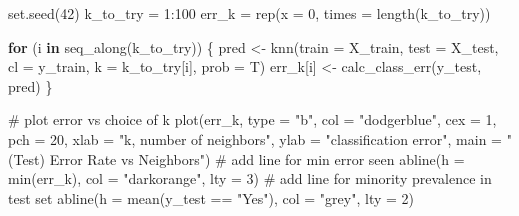 \documentclass[
  letterpaper,
  DIV=11,
  numbers=noendperiod]{scrartcl}
\newenvironment{Shaded}{\begin{snugshade}}{\end{snugshade}}
\newcommand{\AttributeTok}[1]{\textcolor[rgb]{0.40,0.45,0.13}{#1}}
\newcommand{\CommentTok}[1]{\textcolor[rgb]{0.37,0.37,0.37}{#1}}
\newcommand{\ControlFlowTok}[1]{\textcolor[rgb]{0.00,0.23,0.31}{\textbf{#1}}}
\newcommand{\DecValTok}[1]{\textcolor[rgb]{0.68,0.00,0.00}{#1}}
\newcommand{\FunctionTok}[1]{\textcolor[rgb]{0.28,0.35,0.67}{#1}}
\newcommand{\NormalTok}[1]{\textcolor[rgb]{0.00,0.23,0.31}{#1}}
\newcommand{\OtherTok}[1]{\textcolor[rgb]{0.00,0.23,0.31}{#1}}
\newcommand{\SpecialCharTok}[1]{\textcolor[rgb]{0.37,0.37,0.37}{#1}}
\newcommand{\StringTok}[1]{\textcolor[rgb]{0.13,0.47,0.30}{#1}}
\begin{document}
\begin{Shaded}
\begin{Highlighting}[]
\FunctionTok{set.seed}\NormalTok{(}\DecValTok{42}\NormalTok{)}
\NormalTok{k\_to\_try }\OtherTok{=} \DecValTok{1}\SpecialCharTok{:}\DecValTok{100}
\NormalTok{err\_k }\OtherTok{=} \FunctionTok{rep}\NormalTok{(}\AttributeTok{x =} \DecValTok{0}\NormalTok{, }\AttributeTok{times =} \FunctionTok{length}\NormalTok{(k\_to\_try))}

\ControlFlowTok{for}\NormalTok{ (i }\ControlFlowTok{in} \FunctionTok{seq\_along}\NormalTok{(k\_to\_try)) \{}
\NormalTok{  pred }\OtherTok{\textless{}{-}} \FunctionTok{knn}\NormalTok{(}\AttributeTok{train =}\NormalTok{ X\_train, }
             \AttributeTok{test  =}\NormalTok{ X\_test, }
             \AttributeTok{cl    =}\NormalTok{ y\_train, }
             \AttributeTok{k     =}\NormalTok{ k\_to\_try[i], }
             \AttributeTok{prob =}\NormalTok{ T)}
\NormalTok{  err\_k[i] }\OtherTok{\textless{}{-}} \FunctionTok{calc\_class\_err}\NormalTok{(y\_test, pred)}
\NormalTok{\}}
\end{Highlighting}
\end{Shaded}

\begin{Shaded}
\begin{Highlighting}[]
\CommentTok{\# plot error vs choice of k}
\FunctionTok{plot}\NormalTok{(err\_k, }\AttributeTok{type =} \StringTok{"b"}\NormalTok{, }\AttributeTok{col =} \StringTok{"dodgerblue"}\NormalTok{, }\AttributeTok{cex =} \DecValTok{1}\NormalTok{, }\AttributeTok{pch =} \DecValTok{20}\NormalTok{, }
     \AttributeTok{xlab =} \StringTok{"k, number of neighbors"}\NormalTok{, }\AttributeTok{ylab =} \StringTok{"classification error"}\NormalTok{,}
     \AttributeTok{main =} \StringTok{"(Test) Error Rate vs Neighbors"}\NormalTok{)}
\CommentTok{\# add line for min error seen}
\FunctionTok{abline}\NormalTok{(}\AttributeTok{h =} \FunctionTok{min}\NormalTok{(err\_k), }\AttributeTok{col =} \StringTok{"darkorange"}\NormalTok{, }\AttributeTok{lty =} \DecValTok{3}\NormalTok{)}
\CommentTok{\# add line for minority prevalence in test set}
\FunctionTok{abline}\NormalTok{(}\AttributeTok{h =} \FunctionTok{mean}\NormalTok{(y\_test }\SpecialCharTok{==} \StringTok{"Yes"}\NormalTok{), }\AttributeTok{col =} \StringTok{"grey"}\NormalTok{, }\AttributeTok{lty =} \DecValTok{2}\NormalTok{)}
\end{Highlighting}
\end{Shaded}
\end{document}
